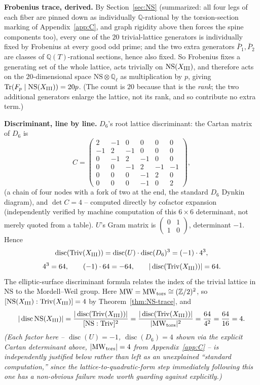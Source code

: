 \documentclass[11pt]{amsart}
\theoremstyle{definition}
\newcommand{\Q}{\mathbb{Q}}
\newcommand{\Z}{\mathbb{Z}}
\newcommand{\Triv}{\mathrm{Triv}}
\newcommand{\NS}{\mathrm{NS}}
\DeclareMathOperator{\Tr}{Tr}
\DeclareMathOperator{\disc}{disc}
\begin{document}
\textbf{Frobenius trace, derived.} By Section~\ref{sec:NS} (summarized:
all four legs of each fiber are pinned down as individually
$\Q$-rational by the torsion-section marking of Appendix~\ref{app:C}, and
graph rigidity above then forces the spine components too), every one of
the $20$ trivial-lattice generators is individually fixed by Frobenius at
every good odd prime; and the two extra generators $\bar P_1,\bar P_2$
are classes of $\Q(T)$-rational sections, hence also fixed. So Frobenius
fixes a generating set of the whole lattice, acts trivially on
$\NS(X_{\rm III})$, and therefore acts on the $20$-dimensional space
$\NS\otimes\Q_\ell$ as multiplication by $p$, giving
$\Tr(F_p\mid\NS(X_{\rm III}))=20p$. (The count is $20$ because that is
the \emph{rank}; the two additional generators enlarge the lattice, not
its rank, and so contribute no extra term.)

\textbf{Discriminant, line by line.} $D_6$'s root lattice discriminant:
the Cartan matrix of $D_6$ is
\[
C=\begin{pmatrix}
2&-1&0&0&0&0\\-1&2&-1&0&0&0\\0&-1&2&-1&0&0\\
0&0&-1&2&-1&-1\\0&0&0&-1&2&0\\0&0&0&-1&0&2
\end{pmatrix},
\]
(a chain of four nodes with a fork of two at the end, the standard $D_6$
Dynkin diagram), and $\det C=4$ -- computed directly by cofactor
expansion (independently verified by machine computation of this
$6\times6$ determinant, not merely quoted from a table). $U$'s Gram
matrix is $\begin{pmatrix}0&1\\1&0\end{pmatrix}$, determinant $-1$. Hence
\[
\disc(\Triv(X_{\rm III})) = \disc(U)\cdot\disc(D_6)^3 = (-1)\cdot4^3,
\]
\[
4^3 = 64,\qquad (-1)\cdot64 = -64,\qquad |\disc(\Triv(X_{\rm III}))| = 64.
\]
The elliptic-surface discriminant formula relates the index of the
trivial lattice in $\NS$ to the Mordell--Weil group. Here
$\mathrm{MW}=\mathrm{MW}_{\rm tors}\cong(\Z/2)^2$, so
$[\NS(X_{\rm III}):\Triv(X_{\rm III})]=4$ by Theorem~\ref{thm:NS-trace},
and
\[
|\disc\NS(X_{\rm III})| = \frac{|\disc(\Triv(X_{\rm III}))|}{[\NS:\Triv]^2}
= \frac{|\disc(\Triv(X_{\rm III}))|}{|\mathrm{MW}_{\rm tors}|^2}
= \frac{64}{4^2} = \frac{64}{16} = 4.
\]
\emph{(Each factor here -- $\disc(U)=-1$, $\disc(D_6)=4$ shown via the
explicit Cartan determinant above, $|\mathrm{MW}_{\rm tors}|=4$ from
Appendix~\ref{app:C} -- is independently justified below rather than
left as an unexplained ``standard computation,'' since the
lattice-to-quadratic-form step immediately following this one has a
non-obvious failure mode worth guarding against explicitly.)}
\end{document}
